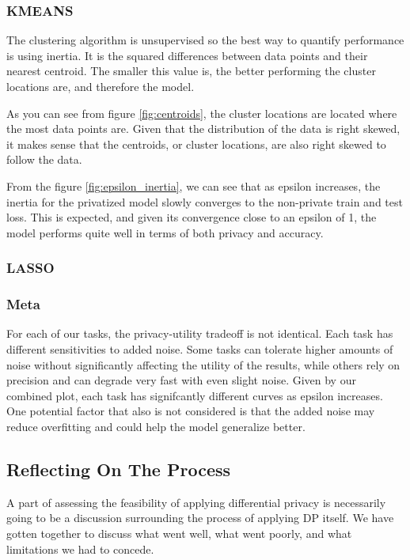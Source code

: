 \documentclass[12pt,letterpaper]{article}
\begin{document}
{\subsubsection{KMEANS}
The clustering algorithm is unsupervised so the best way to quantify performance is using inertia. It is the squared differences between data points and their nearest centroid. The smaller this value is, the better performing the cluster locations are, and therefore the model. 

As you can see from figure \ref{fig:centroids}, the cluster locations are located where the most data points are. Given that the distribution of the data is right skewed, it makes sense that the centroids, or cluster locations, are also right skewed to follow the data. 

From the figure \ref{fig:epsilon_inertia}, we can see that as epsilon increases, the inertia for the privatized model slowly converges to the non-private train and test loss. This is expected, and given its convergence close to an epsilon of 1, the model performs quite well in terms of both privacy and accuracy.

\subsubsection{LASSO}

\subsubsection{Meta}
For each of our tasks, the privacy-utility tradeoff is not identical. Each task has different sensitivities to added noise. Some tasks can tolerate higher amounts of noise without significantly affecting the utility of the results, while others rely on precision and can degrade very fast with even slight noise. Given by our combined plot, each task has signifcantly different curves as epsilon increases. 
One potential factor that also is not considered is that the added noise may reduce overfitting and could help the model generalize better. 

        


\subsection{Reflecting On The Process}
A part of assessing the feasibility of applying differential privacy is necessarily going to be a discussion surrounding the process of applying DP itself. We have gotten together to discuss what went well, what went poorly, and what limitations we had to concede.

}
\end{document}
